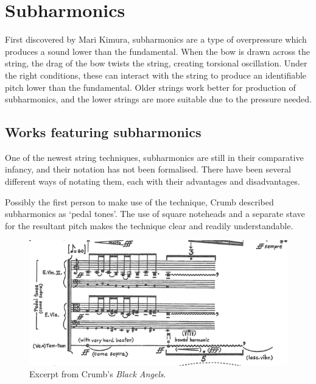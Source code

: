 \section{Subharmonics}
First discovered by Mari Kimura, subharmonics are a type of overpressure which produces a sound lower than the fundamental.\autocite{kimuraHowProduceSubharmonics1999}  When the bow is drawn across the string, the drag of the bow twists the string, creating torsional oscillation. Under the right conditions, these can interact with the string to produce an identifiable pitch lower than the fundamental.\autocite{Subharmonics2006} Older strings work better for production of subharmonics, and the lower strings are more suitable due to the pressure needed.\autocite{kimuraHowProduceSubharmonics1999}


\subsection{Works featuring subharmonics}
One of the newest string techniques, subharmonics are still in their comparative infancy, and their notation has not been formalised. There have been several different ways of notating them, each with their advantages and disadvantages.



Possibly the first person to make use of the technique, Crumb described subharmonics as `pedal tones'.\autocite{crumbBlackAngelsImages1971} The use of square noteheads and a separate stave for the resultant pitch makes the technique clear and readily understandable.
\begin{figure}
    \includegraphics[width=\linewidth]{./resources/crumbBlackAngels.png}
    \caption{Excerpt from Crumb's \emph{Black Angels}.}
\label{fig:Excerpt from Crumb's Black Angels}
  \end{figure}

